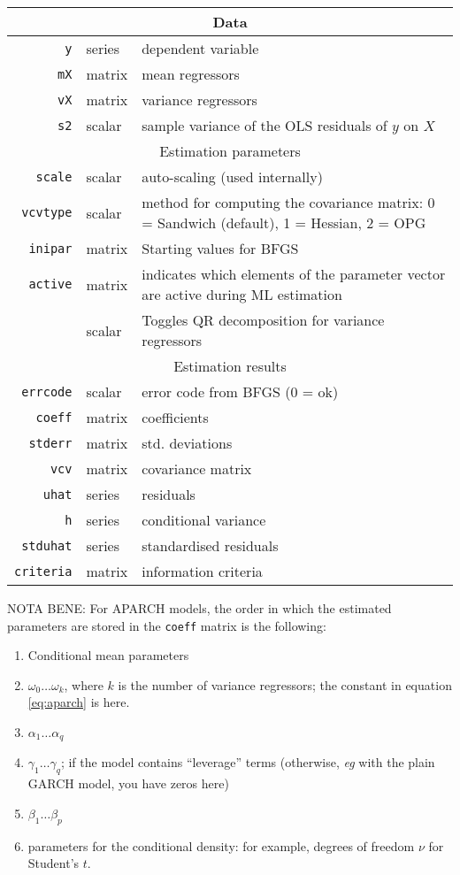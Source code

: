 \documentclass[a4paper,11pt]{article}
\newcommand{\dtk}[1]{\texttt{\detokenize{#1}}}
\begin{document}
\begin{footnotesize}
\begin{tabular}{rlp{}}
  \hline
  \multicolumn{3}{c}{Data} \\
  \hline
  \texttt{y} & series  & dependent variable \\
  \texttt{mX} & matrix & mean regressors \\
  \texttt{vX} & matrix & variance regressors\\
  \texttt{s2} & scalar & sample variance of the OLS residuals of $y$ on $X$
  \\
  \hline
  \multicolumn{3}{c}{Estimation parameters} \\
  \hline
  \texttt{scale} & scalar & auto-scaling (used internally) \\
  \texttt{vcvtype} & scalar & method for computing the covariance
  matrix: 0 = Sandwich (default), 1 = Hessian, 2 = OPG\\
  \texttt{inipar} & matrix  & Starting values for BFGS \\
  \texttt{active} & matrix  & indicates which elements of the parameter
  vector are active during ML estimation\\
  \dtk{vX_QR} & scalar  & Toggles QR decomposition for variance regressors\\
  \hline
  \multicolumn{3}{c}{Estimation results} \\
  \hline
  \texttt{errcode} & scalar & error code from BFGS (0 = ok)\\
  \texttt{coeff} & matrix & coefficients \\
  \texttt{stderr} & matrix & std. deviations \\
  \texttt{vcv} & matrix & covariance matrix \\
  \texttt{uhat} & series & residuals \\
  \texttt{h} & series & conditional variance \\
  \texttt{stduhat} & series & standardised residuals \\
  \texttt{criteria} & matrix & information criteria\\
  \hline
  \hline
\end{tabular}
\end{footnotesize}

\clearpage

NOTA BENE: For APARCH models, the order in which the estimated
parameters are stored in the \texttt{coeff} matrix is the following:
\begin{enumerate}
\item Conditional mean parameters
\item $\omega_0 \ldots \omega_k$, where $k$ is the number of variance
  regressors; the constant in equation \eqref{eq:aparch} is here.
\item $\alpha_1 \ldots \alpha_q$
\item $\gamma_1 \ldots \gamma_q$; if the model contains ``leverage''
  terms (otherwise, \emph{eg} with the plain GARCH model, you have
  zeros here)
\item $\beta_1 \ldots \beta_p$
\item parameters for the conditional density: for example, degrees of
  freedom $\nu$ for Student's $t$.
\end{enumerate}
\end{document}
